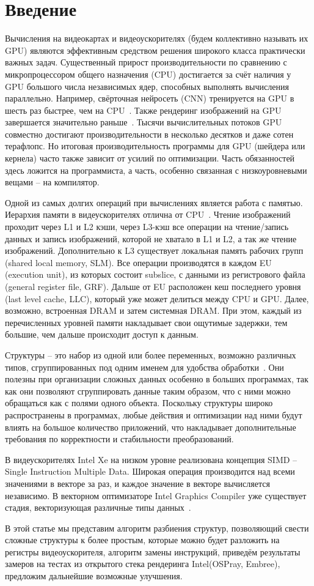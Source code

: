 \section{Введение}
\label{sec:Introduction}
Вычисления на видеокартах и видеоускорителях (будем коллективно называть их GPU) являются эффективным средством решения широкого класса практически важных задач. 
Существенный прирост производительности по сравнению с микропроцессором общего назначения (CPU) достигается за счёт наличия у GPU большого числа независимых ядер, способных выполнять вычисления параллельно.
Например, свёрточная нейросеть (CNN) тренируется на GPU в шесть раз быстрее, чем на CPU~\cite{CNN}. 
Также рендеринг изображений на GPU завершается значительно раньше~\cite{render}.
Тысячи вычислительных потоков GPU совместно достигают производительности в несколько десятков и даже сотен терафлопс. 
Но итоговая производительность программы для GPU (шейдера или кернела) часто также зависит от усилий по оптимизации.
Часть обязанностей здесь ложится на программиста, а часть, особенно связанная с низкоуровневыми вещами -- на компилятор.

Одной из самых долгих операций при вычислениях является работа с памятью. 
Иерархия памяти в видеускорителях отлична от CPU~\cite{MEM}.
Чтение изображений проходит через L1 и L2 кэши, через L3-кэш все операции на чтение/запись данных и запись изображений, которой не хватало в L1 и L2, а так же чтение изображений.
Дополнительно к L3 существует локальная память рабочих групп (shared local memory, SLM).
Все операции производятся в каждом EU (execution unit), из которых состоит subslice, с данными из регистрового файла (general register file, GRF).
Дальше от EU расположен кеш последнего уровня (last level cache, LLC), который уже может делиться между CPU и GPU.
Далее, возможно, встроенная DRAM и затем системная DRAM.
При этом, каждый из перечисленных уровней памяти накладывает свои ощутимые задержки, тем большие, чем дальше происходит доступ к данным.

Структуры -- это набор из одной или более переменных, возможно различных типов, сгруппированных под одним именем для удобства обработки~\cite{Kern}.
Они полезны при организации сложных данных особенно в больших программах, так как они позволяют сгруппировать данные таким образом, что с ними можно обращаться как с полями одного объекта.
Поскольку структуры широко распространены в программах, любые действия и оптимизации над ними будут влиять на большое количество приложений, что накладывает дополнительные требования по корректности и стабильности преобразований.

В видеускорителях Intel Xe на низком уровне реализована концепция SIMD -- Single Instruction Multiple Data.
Широкая операция производится над всеми значениями в векторе за раз, и каждое значение в векторе вычисляется независимо.
В векторном оптимизаторе Intel Graphics Compiler уже существует стадия, векторизующая различные типы данных~\cite{KEN}.

В этой статье мы представим алгоритм разбиения структур, позволяющий свести сложные структуры к более простым, которые можно будет разложить на регистры видеоускорителя, алгоритм замены инструкций, приведём результаты замеров на тестах из открытого стека рендеринга Intel(OSPray, Embree), предложим дальнейшие возможные улучшения.